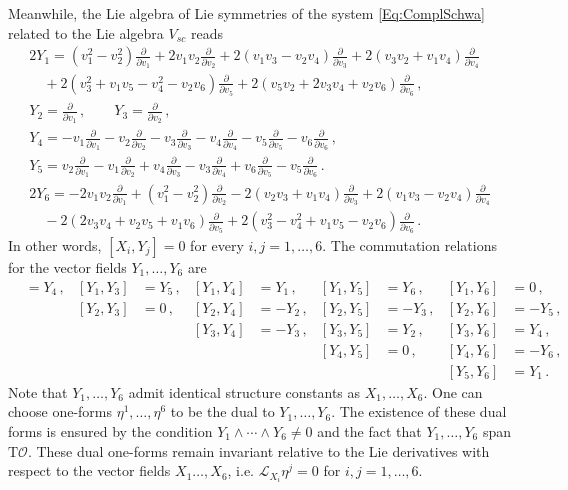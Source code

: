 \documentclass[11pt]{article}
\theoremstyle{plain}
\theoremstyle{definition}
\newcommand{\T}{\mathrm{T}}
\newcommand{\Lie}{\mathscr{L}}
\numberwithin{equation}{section}
\begin{document}
Meanwhile, the Lie algebra of Lie symmetries of the system \eqref{Eq:ComplSchwa} related to the  Lie algebra $V_{sc}$ reads 
\begin{gather}
2Y_1 =(v_1^2-v_2^2)\frac{\partial}{\partial v_1}+2v_1v_2\frac{\partial}{\partial v_2}+2(v_1v_3-v_2v_4)\frac{\partial}{\partial v_3} + 2(v_3v_2+v_1v_4)\frac{\partial}{\partial v_4}\\ \quad + 2(v_3^2+v_1v_5-v_4^2-v_2v_6)\frac{\partial}{\partial v_5}+2(v_5v_2+2v_3v_4+v_2v_6)\frac{\partial}{\partial v_6}\,,\\
Y_2=\frac{\partial}{\partial v_1}\,,\qquad
Y_3 = \frac{\partial}{\partial v_2}\,,\\
Y_4 = -v_1\frac{\partial}{\partial v_1}-v_2\frac{\partial}{\partial v_2}-v_3\frac{\partial}{\partial v_3}-v_4\frac{\partial}{\partial v_4}-v_5\frac{\partial}{\partial v_5}-v_6\frac{\partial}{\partial v_6}\,,\\
Y_5 = v_2\frac{\partial}{\partial v_1}-v_1\frac{\partial}{\partial v_2}+v_4\frac{\partial}{\partial v_3}-v_3\frac{\partial}{\partial v_4}+v_6\frac{\partial}{\partial v_5}-v_5\frac{\partial}{\partial v_6}\,.\\
2Y_6 = -2v_1v_2\frac{\partial}{\partial v_1}+(v_1^2-v_2^2)\frac{\partial}{\partial v_2}-2(v_2v_3+v_1v_4)\frac{\partial}{\partial v_3}+2(v_1v_3-v_2v_4)\frac{\partial}{\partial v_4} \\
\quad -2(2v_3v_4+v_2v_5+v_1v_6)\frac{\partial}{\partial v_5}+2(v_3^2-v_4^2+v_1v_5-v_2v_6)\frac{\partial}{\partial v_6}\,.
\end{gather}
In other words, $[X_i,Y_j]=0$ for every $i,j=1,\ldots,6$. The commutation relations for the vector fields $Y_1,\ldots,Y_6$ are
\begin{align}
    [Y_1,Y_2] &= Y_4\,, & [Y_1,Y_3] &= Y_5\,, & [Y_1,Y_4] &= Y_1\,, & [Y_1,Y_5] &= Y_6\,, & [Y_1,Y_6] &= 0\,,\\%
    &&[Y_2,Y_3] &= 0\,, & [Y_2,Y_4] &= -Y_2\,, & [Y_2,Y_5] &= -Y_3\,, & [Y_2,Y_6] &= -Y_5\,,\\
    &&&&[Y_3,Y_4] &=-Y_3\,, & [Y_3,Y_5] &=Y_2\,, & [Y_3,Y_6] &= Y_4\,,\\
    &&&&&&[Y_4,Y_5] &= 0\,, & [Y_4,Y_6] &= -Y_6\,,\\
    &&&&&&&&[Y_5,Y_6] &= Y_1\,.
\end{align}
Note that $Y_1,\ldots,Y_6$ admit identical structure constants as $X_1,\ldots,X_6$. One can choose one-forms $\eta^1,\ldots,\eta^6$ to be the dual to $Y_1,\ldots,Y_6$. The existence of these dual forms is ensured by the condition $Y_1\wedge \dotsb \wedge Y_6\neq 0$ and the fact that $Y_1,\ldots,Y_6$ span $\T\mathcal{O}$. These dual one-forms remain invariant relative to the Lie derivatives with respect to the vector fields $X_1\ldots, X_6$, i.e. $\Lie_{X_i}\eta^j=0$ for $i,j=1,\ldots,6$.
\end{document}
